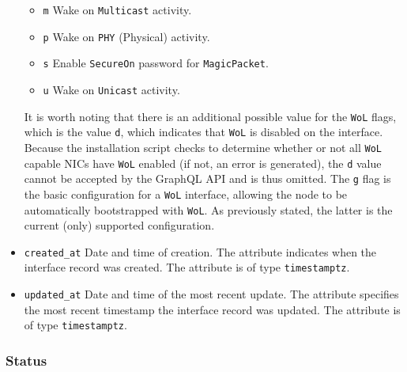 \begin{itemize}
\begin{itemize}
      \item \texttt{m}
        \newline
        Wake on \texttt{Multicast} activity.

      \item \texttt{p}
        \newline
        Wake on \texttt{PHY} (Physical) activity.

      \item \texttt{s}
        \newline
        Enable \texttt{SecureOn} password for \texttt{MagicPacket}.

      \item \texttt{u}
        \newline
        Wake on \texttt{Unicast} activity.
    \end{itemize}
    It is worth noting that there is an additional possible value for the
    \texttt{WoL} flags, which is the value \texttt{d}, which indicates that
    \texttt{WoL} is disabled on the interface. Because the installation script
    checks to determine whether or not all \texttt{WoL} capable NICs have \texttt{WoL}
    enabled (if not, an error is generated), the \texttt{d} value cannot be accepted
    by the GraphQL API and is thus omitted.
    \newline
    The \texttt{g} flag is the basic configuration for a \texttt{WoL} interface,
    allowing the node to be automatically bootstrapped with \texttt{WoL}. As previously
    stated, the latter is the current (only) supported configuration.

  \item \texttt{created\_at}
    \newline
    Date and time of creation.
    \newline
    The attribute indicates when the interface record was created.
    \newline
    The attribute is of type \texttt{timestamptz}.

  \item \texttt{updated\_at}
    \newline
    Date and time of the most recent update.
    \newline
    The attribute specifies the most recent timestamp the interface record was updated.
    \newline
    The attribute is of type \texttt{timestamptz}.
\end{itemize}

\subsubsection{Status}
\label{subsubsec:implementation_server_database_status}

